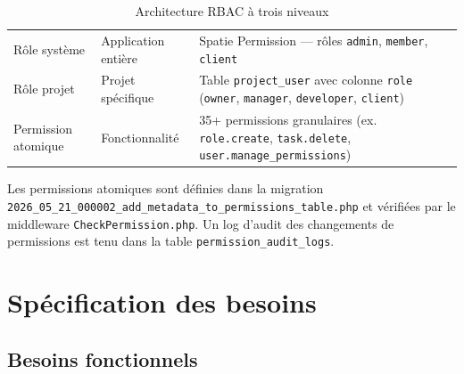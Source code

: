 \begin{table}[H]
  \centering
  \caption{Architecture RBAC à trois niveaux}
  \label{tab:rbac_niveaux}
  \begin{tabularx}{\textwidth}{L{3cm}L{3cm}X}
    \toprule
     &  &  \\
    \midrule
    Rôle système   & Application entière & Spatie Permission — rôles
                     \texttt{admin}, \texttt{member}, \texttt{client} \\
    Rôle projet    & Projet spécifique   & Table \texttt{project\_user} avec colonne
                     \texttt{role} (\texttt{owner}, \texttt{manager}, \texttt{developer},
                     \texttt{client}) \\
    Permission atomique & Fonctionnalité & 35+ permissions granulaires
                     (ex. \texttt{role.create}, \texttt{task.delete},
                     \texttt{user.manage\_permissions}) \\
    \bottomrule
  \end{tabularx}
\end{table}

Les permissions atomiques sont définies dans la migration
\texttt{2026\_05\_21\_000002\_add\_metadata\_to\_permissions\_table.php}
et vérifiées par le middleware \texttt{CheckPermission.php}.
Un log d'audit des changements de permissions est tenu dans la table
\texttt{permission\_audit\_logs}.

\section{Spécification des besoins}

\subsection{Besoins fonctionnels}

